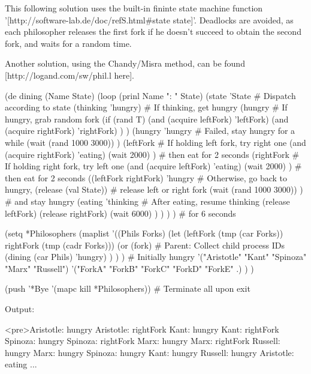 \begin{wideverbatim}

This following solution uses the built-in fininte state machine function
'[http://software-lab.de/doc/refS.html#state state]'. Deadlocks are avoided, as
each philosopher releases the first fork if he doesn't succeed to obtain the
second fork, and waits for a random time.

Another solution, using the Chandy/Misra method, can be found
[http://logand.com/sw/phil.l here].

(de dining (Name State)
   (loop
      (prinl Name ": " State)
      (state 'State                       # Dispatch according to state
         (thinking 'hungry)               # If thinking, get hungry
         (hungry                          # If hungry, grab random fork
            (if (rand T)
               (and (acquire leftFork) 'leftFork)
               (and (acquire rightFork) 'rightFork) ) )
         (hungry 'hungry                  # Failed, stay hungry for a while
            (wait (rand 1000 3000)) )
         (leftFork                        # If holding left fork, try right one
            (and (acquire rightFork) 'eating)
            (wait 2000) )                 # then eat for 2 seconds
         (rightFork                       # If holding right fork, try left one
            (and (acquire leftFork) 'eating)
            (wait 2000) )                 # then eat for 2 seconds
         ((leftFork rightFork) 'hungry    # Otherwise, go back to hungry,
            (release (val State))         # release left or right fork
            (wait (rand 1000 3000)) )     # and stay hungry
         (eating 'thinking             # After eating, resume thinking
            (release leftFork)
            (release rightFork)
            (wait 6000) ) ) ) )           # for 6 seconds
 
(setq *Philosophers
   (maplist
      '((Phils Forks)
         (let (leftFork (tmp (car Forks))  rightFork (tmp (cadr Forks)))
            (or
               (fork)  # Parent: Collect child process IDs
               (dining (car Phils) 'hungry) ) ) )  # Initially hungry
      '("Aristotle" "Kant" "Spinoza" "Marx" "Russell")
      '("ForkA" "ForkB" "ForkC" "ForkD" "ForkE" .) ) )
 
(push '*Bye '(mapc kill *Philosophers))  # Terminate all upon exit

\end{wideverbatim}

\begin{wideverbatim}

Output:

<pre>Aristotle: hungry
Aristotle: rightFork
Kant: hungry
Kant: rightFork
Spinoza: hungry
Spinoza: rightFork
Marx: hungry
Marx: rightFork
Russell: hungry
Marx: hungry
Spinoza: hungry
Kant: hungry
Russell: hungry
Aristotle: eating
...

\end{wideverbatim}

